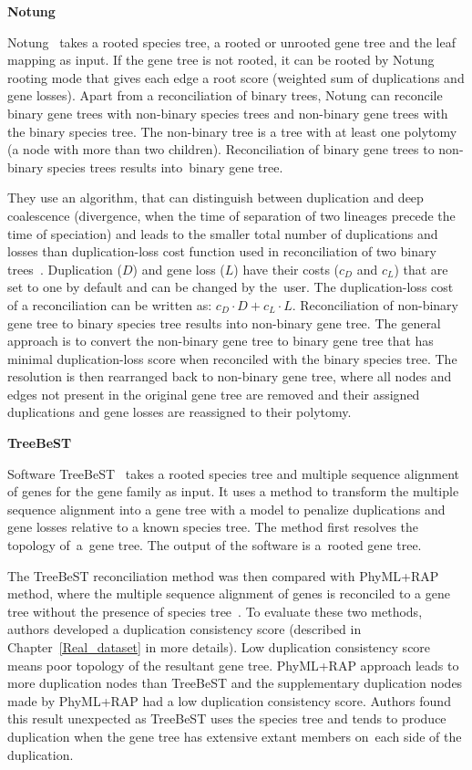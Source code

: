 \noindent \textbf{Notung}  

Notung~\cite{notung} takes a rooted species tree, a rooted or unrooted gene tree and the leaf mapping as input. If the gene tree is not rooted, it can be rooted by Notung rooting mode that gives each edge a root score (weighted sum of duplications and gene losses). Apart from a reconciliation of binary trees, Notung can reconcile binary gene trees with non-binary species trees and non-binary gene trees with the binary species tree. The non-binary tree is a tree with at least one polytomy (a node with more than two children). Reconciliation of binary gene trees to non-binary species trees results into~binary gene tree.

They use an algorithm, that can distinguish between duplication and deep coalescence (divergence, when the time of separation of two lineages precede the time of speciation) and leads to the smaller total number of duplications and losses than duplication-loss cost function used in reconciliation of two binary trees~\cite{vernot}. Duplication ($D$) and gene loss ($L$) have their costs ($c_D$ and $c_L$) that are set to one by default and can be changed by the~user. The duplication-loss cost of a reconciliation can be written as: $c_D \cdot D+c_L \cdot L$. Reconciliation of non-binary gene tree to binary species tree results into non-binary gene tree. The general approach is to convert the non-binary gene tree to binary gene tree that has minimal duplication-loss score when reconciled with the binary species tree. The resolution is then rearranged back to non-binary gene tree, where all nodes and edges not present in the original gene tree are removed and their assigned duplications and gene losses are reassigned to their polytomy.

\noindent \textbf{TreeBeST} 

Software TreeBeST~\cite{treebest_online} takes a rooted species tree and multiple sequence alignment of genes for the gene family as input. It uses a method to transform the multiple sequence alignment into a gene tree with a model to penalize duplications and gene losses relative to a known species tree. The method first resolves the topology of~a~gene tree. The output of the software is a~rooted gene tree.

The TreeBeST reconciliation method was then compared with PhyML+RAP method, where the multiple sequence alignment of genes is reconciled to a gene tree without the presence of species tree~\cite{treebest}. To evaluate these two methods, authors developed a duplication consistency score (described in Chapter~\ref{Real_dataset} in more details). Low duplication consistency score means poor topology of the resultant gene tree. PhyML+RAP approach leads to more duplication nodes than TreeBeST and the supplementary duplication nodes made by PhyML+RAP had a low duplication consistency score. Authors found this result unexpected as TreeBeST uses the species tree and tends to produce duplication when the gene tree has extensive extant members on~each side of the duplication.

